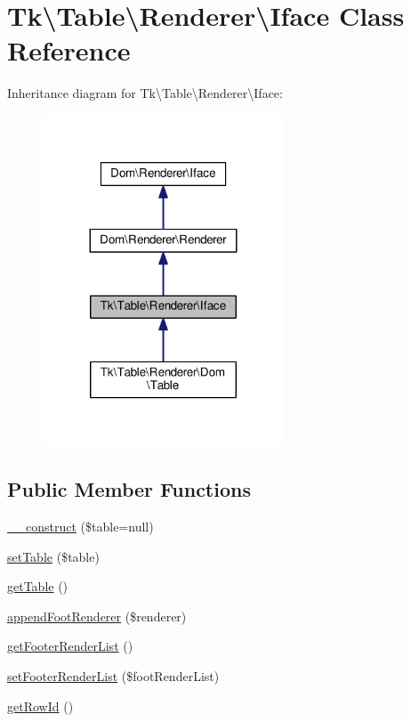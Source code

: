 \hypertarget{classTk_1_1Table_1_1Renderer_1_1Iface}{\section{Tk\textbackslash{}Table\textbackslash{}Renderer\textbackslash{}Iface Class Reference}
\label{classTk_1_1Table_1_1Renderer_1_1Iface}
}


Inheritance diagram for Tk\textbackslash{}Table\textbackslash{}Renderer\textbackslash{}Iface\+:\nopagebreak
\begin{figure}[H]
\begin{center}
\leavevmode
\includegraphics[width=203pt]{classTk_1_1Table_1_1Renderer_1_1Iface__inherit__graph}
\end{center}
\end{figure}
\subsection*{Public Member Functions}
\begin{DoxyCompactItemize}
\item 
\hyperlink{classTk_1_1Table_1_1Renderer_1_1Iface_a0dc0aee58d8b85c8ef927bd872d86cf7}{\+\_\+\+\_\+construct} (\$table=null)
\item 
\hyperlink{classTk_1_1Table_1_1Renderer_1_1Iface_a160e91cba1b6e1fbde406a99b9dbaa99}{set\+Table} (\$table)
\item 
\hyperlink{classTk_1_1Table_1_1Renderer_1_1Iface_a18950454d6c078fa30dbdeb166304a78}{get\+Table} ()
\item 
\hyperlink{classTk_1_1Table_1_1Renderer_1_1Iface_a7a67228562c01a78aab1f4f53dae6e82}{append\+Foot\+Renderer} (\$renderer)
\item 
\hyperlink{classTk_1_1Table_1_1Renderer_1_1Iface_a72d642c266fadc5610e9fb42ed8480c5}{get\+Footer\+Render\+List} ()
\item 
\hyperlink{classTk_1_1Table_1_1Renderer_1_1Iface_a2a342af495394bc1b15da8e8a4b9f8ec}{set\+Footer\+Render\+List} (\$foot\+Render\+List)
\item 
\hyperlink{classTk_1_1Table_1_1Renderer_1_1Iface_a5afb7e3ac6b4368bf22a341bb1541b42}{get\+Row\+Id} ()
\end{DoxyCompactItemize}
